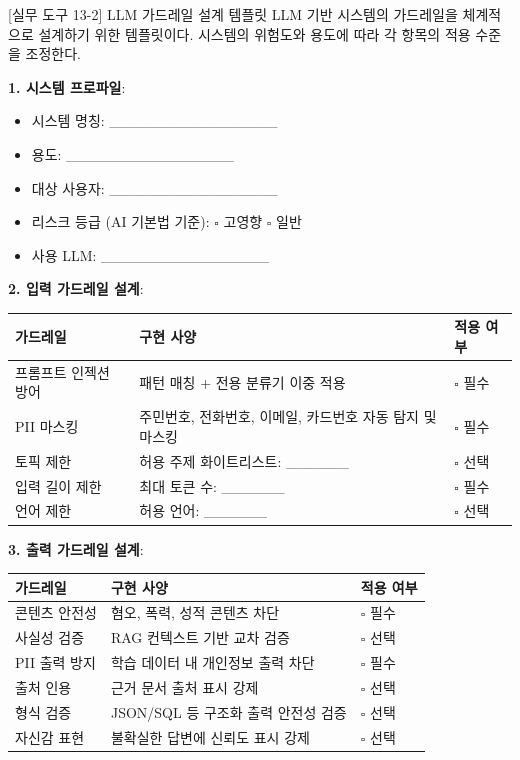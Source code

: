 \begin{practicaltool}{[실무 도구 13-2] LLM 가드레일 설계 템플릿}
LLM 기반 시스템의 가드레일을 체계적으로 설계하기 위한 템플릿이다. 시스템의 위험도와 용도에 따라 각 항목의 적용 수준을 조정한다.

\textbf{1. 시스템 프로파일}:
\begin{itemize}
 \item 시스템 명칭: \_\_\_\_\_\_\_\_\_\_\_\_\_\_\_\_
 \item 용도: \_\_\_\_\_\_\_\_\_\_\_\_\_\_\_\_
 \item 대상 사용자: \_\_\_\_\_\_\_\_\_\_\_\_\_\_\_\_
 \item 리스크 등급 (AI 기본법 기준): $\square$ 고영향 $\square$ 일반
 \item 사용 LLM: \_\_\_\_\_\_\_\_\_\_\_\_\_\_\_\_
\end{itemize}

\textbf{2. 입력 가드레일 설계}:

\begin{tabularx}{\textwidth}{|p{3cm}|X|p{2cm}|}
\hline
\textbf{가드레일} & \textbf{구현 사양} & \textbf{적용 여부} \\
\hline
프롬프트 인젝션 방어 & 패턴 매칭 + 전용 분류기 이중 적용 & $\square$ 필수 \\
\hline
PII 마스킹 & 주민번호, 전화번호, 이메일, 카드번호 자동 탐지 및 마스킹 & $\square$ 필수 \\
\hline
토픽 제한 & 허용 주제 화이트리스트: \_\_\_\_\_\_ & $\square$ 선택 \\
\hline
입력 길이 제한 & 최대 토큰 수: \_\_\_\_\_\_ & $\square$ 필수 \\
\hline
언어 제한 & 허용 언어: \_\_\_\_\_\_ & $\square$ 선택 \\
\hline
\end{tabularx}

\textbf{3. 출력 가드레일 설계}:

\begin{tabularx}{\textwidth}{|p{3cm}|X|p{2cm}|}
\hline
\textbf{가드레일} & \textbf{구현 사양} & \textbf{적용 여부} \\
\hline
콘텐츠 안전성 & 혐오, 폭력, 성적 콘텐츠 차단 & $\square$ 필수 \\
\hline
사실성 검증 & RAG 컨텍스트 기반 교차 검증 & $\square$ 선택 \\
\hline
PII 출력 방지 & 학습 데이터 내 개인정보 출력 차단 & $\square$ 필수 \\
\hline
출처 인용 & 근거 문서 출처 표시 강제 & $\square$ 선택 \\
\hline
형식 검증 & JSON/SQL 등 구조화 출력 안전성 검증 & $\square$ 선택 \\
\hline
자신감 표현 & 불확실한 답변에 신뢰도 표시 강제 & $\square$ 선택 \\
\hline
\end{tabularx}


\end{practicaltool}
